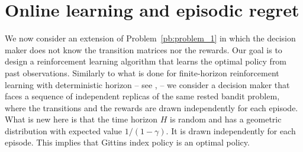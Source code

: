 %
%

\section{Online learning and episodic regret}
\label{sec:problem}

We now consider an extension of Problem~\ref{pb:problem_1} in which the decision maker does not know the transition matrices
nor the rewards. Our goal is to design a reinforcement learning algorithm that
learns the optimal policy from past observations.  Similarly to what is done
for finite-horizon reinforcement learning with deterministic horizon -- see
\eg, \cite{zanette2019tighter,jin2018q,azar2017minimax,osband2013more} --
we consider a decision maker that faces a sequence of independent replicas of
the same rested bandit problem, where the transitions and the rewards 
are drawn independently for each episode.
What is new here is that  the time horizon $H$ is random and has a geometric distribution with expected value $1/(1-\gamma)$. It is drawn  independently for each episode. This implies that Gittins index policy is an optimal policy. %

